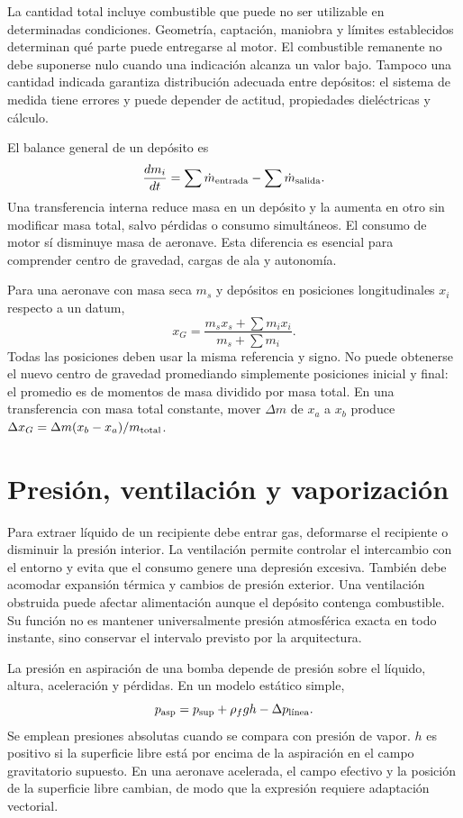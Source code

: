 La cantidad total incluye combustible que puede no ser utilizable en determinadas condiciones. Geometría, captación, maniobra y límites establecidos determinan qué parte puede entregarse al motor. El combustible remanente no debe suponerse nulo cuando una indicación alcanza un valor bajo. Tampoco una cantidad indicada garantiza distribución adecuada entre depósitos: el sistema de medida tiene errores y puede depender de actitud, propiedades dieléctricas y cálculo.

El balance general de un depósito es
\begin{equation}
 \frac{dm_i}{dt}=\sum\dot m_{\rm entrada}-\sum\dot m_{\rm salida}.
\end{equation}
Una transferencia interna reduce masa en un depósito y la aumenta en otro sin modificar masa total, salvo pérdidas o consumo simultáneos. El consumo de motor sí disminuye masa de aeronave. Esta diferencia es esencial para comprender centro de gravedad, cargas de ala y autonomía.

Para una aeronave con masa seca $m_s$ y depósitos en posiciones longitudinales $x_i$ respecto a un datum,
\begin{equation}
 x_G=\frac{m_sx_s+\sum m_ix_i}{m_s+\sum m_i}.
\end{equation}
Todas las posiciones deben usar la misma referencia y signo. No puede obtenerse el nuevo centro de gravedad promediando simplemente posiciones inicial y final: el promedio es de momentos de masa dividido por masa total. En una transferencia con masa total constante, mover $\Delta m$ de $x_a$ a $x_b$ produce $\Delta x_G=\Delta m(x_b-x_a)/m_{\rm total}$.

\section{Presión, ventilación y vaporización}
Para extraer líquido de un recipiente debe entrar gas, deformarse el recipiente o disminuir la presión interior. La ventilación permite controlar el intercambio con el entorno y evita que el consumo genere una depresión excesiva. También debe acomodar expansión térmica y cambios de presión exterior. Una ventilación obstruida puede afectar alimentación aunque el depósito contenga combustible. Su función no es mantener universalmente presión atmosférica exacta en todo instante, sino conservar el intervalo previsto por la arquitectura.

La presión en aspiración de una bomba depende de presión sobre el líquido, altura, aceleración y pérdidas. En un modelo estático simple,
\begin{equation}
 p_{\rm asp}=p_{\rm sup}+\rho_f g h-\Delta p_{\text{línea}}.
\end{equation}
Se emplean presiones absolutas cuando se compara con presión de vapor. $h$ es positivo si la superficie libre está por encima de la aspiración en el campo gravitatorio supuesto. En una aeronave acelerada, el campo efectivo y la posición de la superficie libre cambian, de modo que la expresión requiere adaptación vectorial.


